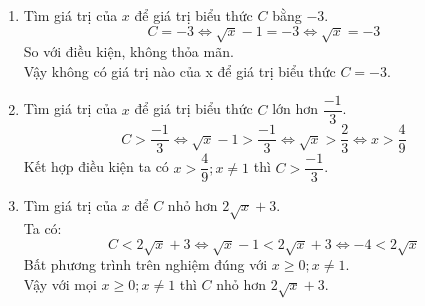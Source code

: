 \begin{bt}
{\begin{enumerate}
\begin{eqnarray*}
				& \Rightarrow & \sqrt x  = \left| \sqrt 7  - 1 \right| = \sqrt 7  - 1 \\
				& \Rightarrow & C = \sqrt x  - 1 = \sqrt 7  - 1 - 1 = \sqrt 7  - 2
			\end{eqnarray*}
			Vậy $C = \sqrt 7  - 2$.
			\item Tìm giá trị của $x$ để giá trị biểu thức $C$ bằng $ - 3$.\\
			$$C =  - 3 \Leftrightarrow \sqrt x  - 1 =  - 3 \Leftrightarrow \sqrt x  =  - 3$$
			So với điều kiện, không thỏa mãn.\\
			Vậy không có giá trị nào của x để giá trị biểu thức $C =  - 3$.
			\item Tìm giá trị của $x$ để giá trị biểu thức $C$ lớn hơn $\dfrac{-1}{3}$.\\
			$$ C > \dfrac{-1}{3} \Leftrightarrow \sqrt x  - 1 > \dfrac{-1}{3} \Leftrightarrow \sqrt x  > \dfrac{2}{3} \Leftrightarrow x > \dfrac{4}{9} $$
			Kết hợp điều kiện ta có $x > \dfrac{4}{9};x \ne 1$ thì $C > \dfrac{-1}{3}$.
			\item Tìm giá trị của $x$ để $C$ nhỏ hơn $2\sqrt x  + 3$.\\
			Ta có:
			$$C < 2\sqrt x  + 3 \Leftrightarrow \sqrt x  - 1 < 2\sqrt x  + 3 \Leftrightarrow  - 4 < 2\sqrt x $$
			Bất phương trình trên nghiệm đúng với $x \ge 0;x \ne 1$.\\
			Vậy với mọi $x \ge 0;x \ne 1$ thì $C$ nhỏ hơn $2\sqrt x  + 3$.
		\end{enumerate}
	}
\end{bt}
